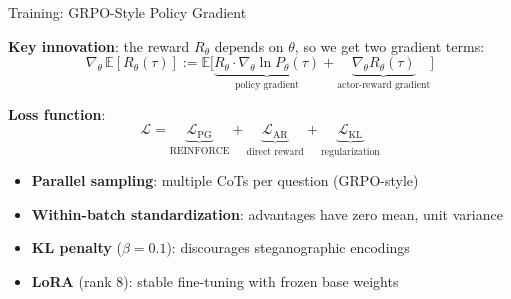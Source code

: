 \documentclass[aspectratio=169]{beamer}
\begin{document}
\begin{frame}{Training: GRPO-Style Policy Gradient}

\textbf{Key innovation}: the reward $R_\theta$ depends on $\theta$, so we get two gradient terms:
\[
\nabla_\theta\, \mathbb{E}[R_\theta(\tau)]
:= \mathbb{E}\!\Big[\underbrace{R_\theta \cdot \nabla_\theta \ln P_\theta(\tau)}_{\text{policy gradient}}
  + \underbrace{\nabla_\theta R_\theta(\tau)}_{\text{actor-reward gradient}}\Big]
\]
\vspace{-0.35cm}

\textbf{Loss function}:
\[
\mathcal{L} = \underbrace{\mathcal{L}_{\text{PG}}}_{\text{REINFORCE}} + \underbrace{\mathcal{L}_{\text{AR}}}_{\text{direct reward}} + \underbrace{\mathcal{L}_{\text{KL}}}_{\text{regularization}}
\]
\vspace{-0.25cm}

\begin{itemize}
    \itemsep 0.2em
    \item \textbf{Parallel sampling}: multiple CoTs per question (GRPO-style)
    \item \textbf{Within-batch standardization}: advantages have zero mean, unit variance
    \item \textbf{KL penalty} ($\beta = 0.1$): discourages steganographic encodings
    \item \textbf{LoRA} (rank 8): stable fine-tuning with frozen base weights
\end{itemize}
\end{frame}
\end{document}
